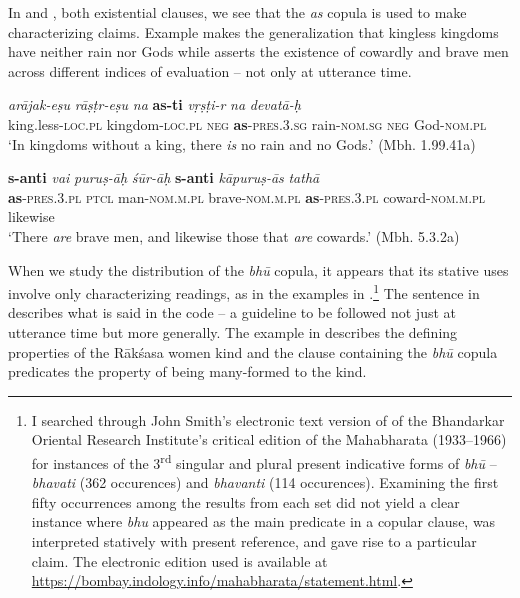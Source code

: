 \documentclass[output=paper,hidelinks]{langscibook}
\begin{document}
\begin{exe}
\begin{xlist}
\begin{xlist}
\begin{exe}
\begin{exe}
\begin{exe}
\begin{exe}
\begin{xlist}
In  and , both existential clauses, we see that the \textit{as} copula is used to make characterizing claims. Example  makes the generalization that kingless king\-doms have neither rain nor Gods while  asserts the existence of cowardly and brave men across different indices of evaluation -- not only at utterance time.

\begin{exe}
\label{as2}
\ex

\begin{xlist}
\ex
\gll
\emph{arājak-e\d{s}u} \emph{rā\d{s}ṭr-e\d{s}u} \emph{na} \textbf{as-ti} \emph{v\d{r}\d{s}ṭi-r} \emph{na} \emph{devatā-\d{h}}\\
king.less-\textsc{loc.pl} kingdom-\textsc{loc.pl} \textsc{neg} \textbf{as}-\textsc{pres.3.sg} rain-\textsc{nom.sg} \textsc{neg} God-\textsc{nom.pl}\\
\glt `In kingdoms without a king, there \emph{is} no rain and no Gods.' (Mbh. 1.99.41a) \label{rain}

\ex
\gll \textbf{s-anti} \emph{vai} \emph{puru\d{s}-ā\d{h}} \emph{\'{s}\={u}r-ā\d{h}} \textbf{s-anti} \emph{kāpuru\d{s}-ās} \emph{tathā}\\
\textbf{as}-\textsc{pres.3.pl} \textsc{ptcl} man-\textsc{nom.m.pl} brave-\textsc{nom.m.pl} \textbf{as}-\textsc{pres.3.pl} coward-\textsc{nom.m.pl} likewise\\
\glt `There \emph{are} brave men, and likewise those that \emph{are} cowards.' (Mbh. 5.3.2a) \label{brave}
\z
\z

When we study the distribution of the \emph{bh\={u}} copula, it appears that its stative uses involve only characterizing readings, as in the examples in .\footnote{I searched through John Smith's electronic text version of of the Bhandarkar Oriental Research Institute's critical edition of the Mahabharata (1933--1966) for instances of the 3\textsuperscript{rd} singular and plural present indicative forms of \emph{bh\={u}} -- \emph{bhavati} (362 occurences) and \emph{bhavanti} (114 occurences). Examining the first fifty occurrences among the results from each set did not yield a clear instance where \emph{bhu} appeared as the main predicate in a copular clause, was interpreted statively with present reference, and gave rise to a particular claim. The electronic edition used is available at \url{https://bombay.indology.info/mahabharata/statement.html}.} The sentence in  describes what is said in the code -- a guideline to be followed not just at utterance time but more generally. The example in  describes the defining properties of the Rāk\'{s}asa women kind and the clause containing the \emph{bh\={u}} copula predicates the property of being many-formed to the kind.


\end{xlist}
\end{exe}
\end{xlist}
\end{exe}
\end{exe}
\end{exe}
\end{exe}
\end{xlist}
\end{xlist}
\end{exe}
\end{document}
